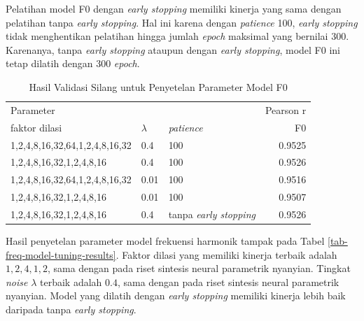 Pelatihan model F0 dengan \textit{early stopping} memiliki kinerja yang sama dengan pelatihan tanpa \textit{early stopping}. Hal ini karena dengan \textit{patience} 100, \textit{early stopping} tidak menghentikan pelatihan hingga jumlah \textit{epoch} maksimal yang bernilai 300. Karenanya, tanpa \textit{early stopping} ataupun dengan \textit{early stopping}, model F0 ini tetap dilatih dengan 300 \textit{epoch}.

\begin{table}[htbp]
    \centering
    \caption{Hasil Validasi Silang untuk Penyetelan Parameter Model F0}\label{tab-f0-model-tuning-results}
    \begin{tabular}{ |l|l|l|r| } 
     \hline
     \multicolumn{3}{|l|}{Parameter} & Pearson r\\
     \cline{1-3}
     faktor dilasi & $\lambda$ & \textit{patience} & F0\\
     \hline 
	1,2,4,8,16,32,64,1,2,4,8,16,32 & 0.4 &100      &0.9525\\\hline
	1,2,4,8,16,32,1,2,4,8,16 & 0.4 &100            &0.9526\\\hline
	1,2,4,8,16,32,64,1,2,4,8,16,32 & 0.01 &100     &0.9516\\\hline
	1,2,4,8,16,32,1,2,4,8,16 & 0.01 &100           &0.9507\\\hline
	1,2,4,8,16,32,1,2,4,8,16 & 0.4 &tanpa \textit{early stopping}    &0.9526\\\hline
    \end{tabular}
\end{table}

Hasil penyetelan parameter model frekuensi harmonik tampak pada Tabel \ref{tab-freq-model-tuning-results}. Faktor dilasi yang memiliki kinerja terbaik adalah $1,2,4,1,2$, sama dengan pada riset sintesis neural parametrik nyanyian. Tingkat \textit{noise} $\lambda$ terbaik adalah $0.4$, sama dengan pada riset sintesis neural parametrik nyanyian. Model yang dilatih dengan \textit{early stopping} memiliki kinerja lebih baik daripada tanpa \textit{early stopping}.

